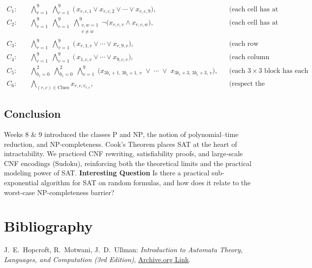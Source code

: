 \documentclass{article}
\theoremstyle{theorem}
\theoremstyle{definition}
\theoremstyle{remark}
\begin{document}
\[
\begin{aligned}
C_1{:}&\quad
\bigwedge_{r=1}^9\;\bigwedge_{c=1}^9\;\bigl(\,x_{r,c,1}\lor x_{r,c,2}\lor\cdots\lor x_{r,c,9}\bigr),
&&\text{(each cell has at least one value)}\\
C_2{:}&\quad
\bigwedge_{r=1}^9\;\bigwedge_{c=1}^9\;\bigwedge_{\substack{v,w=1\\v\neq w}}^9
\neg\bigl(x_{r,c,v}\land x_{r,c,w}\bigr),
&&\text{(each cell has at most one value)}\\
C_3{:}&\quad
\bigwedge_{r=1}^9\;\bigwedge_{v=1}^9\;\bigl(\,x_{r,1,v}\lor\cdots\lor x_{r,9,v}\bigr),
&&\text{(each row contains each value)}\\
C_4{:}&\quad
\bigwedge_{c=1}^9\;\bigwedge_{v=1}^9\;\bigl(\,x_{1,c,v}\lor\cdots\lor x_{9,c,v}\bigr),
&&\text{(each column contains each value)}\\
C_5{:}&\quad
\bigwedge_{b_r=0}^2\;\bigwedge_{b_c=0}^2\;\bigwedge_{v=1}^9
\;\bigl(x_{3b_r+1,\,3b_c+1,\,v}\;\lor\;\cdots\;\lor\;x_{3b_r+3,\,3b_c+3,\,v}\bigr),
&&\text{(each \(3\times3\) block has each value)}\\
C_6{:}&\quad
\bigwedge_{(r,c)\in\mathrm{Clues}}x_{r,c,v_{r,c}},
&&\text{(respect the given clues).}
\end{aligned}
\]

\subsection{Conclusion}
Weeks 8 \& 9 introduced the classes \(\mathrm{P}\) and \(\mathrm{NP}\), the
notion of polynomial–time reduction, and NP‐completeness.  Cook’s Theorem
places SAT at the heart of intractability.  We practiced CNF rewriting,
satisfiability proofs, and large‐scale CNF encodings (Sudoku), reinforcing
both the theoretical limits and the practical modeling power of SAT.
\textbf{Interesting Question}
Is there a practical sub-exponential algorithm for SAT on random formulas,
and how does it relate to the worst-case NP-completeness barrier?

\section{Bibliography}
\begin{thebibliography}{99}
J.~E.~Hopcroft, R.~Motwani, J.~D.~Ullman:
\emph{Introduction to Automata Theory, Languages, and Computation (3rd Edition)},
\href{https://archive.org/details/hopcroft-motwani-ullman-introduction-to-automata-theory-languages-and-computations-3rd-edition/page/65/mode/1up?view=theater}{Archive.org Link}.
\end{thebibliography}
\end{document}
